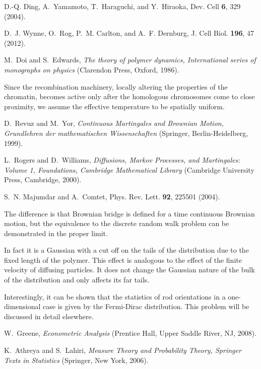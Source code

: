 \documentclass[aps,showpacs,twocolumn,floatfix,prx,superscriptaddress]{revtex4-1}
\begin{document}
\begin{thebibliography}{10}
D.-Q. Ding,
  A.~Yamamoto,
  T.~Haraguchi,
  and Y.~Hiraoka,
  Dev. Cell \textbf{6},
  329 (2004).

D.~J. Wynne,
  O.~Rog,
  P.~M. Carlton,
  and A.~F.
  Dernburg, J. Cell Biol.
  \textbf{196}, 47 (2012).

M.~Doi and
  S.~Edwards,
  \emph{The theory of polymer dynamics, International series
  of monographs on physics} (Clarendon Press, Oxford,
  1986).
  
{\color{blue} Since the recombination machinery, locally altering the properties of the chromatin, becomes active only after the homologous chromosomes come to close proximity, we assume the effective temperature to be spatially uniform.}

D.~Revuz and
  M.~Yor,
  \emph{Continuous Martingales and Brownian Motion,
  Grundlehren der mathematischen Wissenschaften} (Springer, Berlin-Heidelberg, 1999).

L.~Rogers and
  D.~Williams,
  \emph{Diffusions, Markov Processes, and Martingales: Volume
  1, Foundations, Cambridge Mathematical Library}
  (Cambridge University Press, Cambridge, 2000).

S.~N. Majumdar and
  A.~Comtet,
  Phys. Rev. Lett. \textbf{92},
  225501 (2004).
  

The difference is that Brownian bridge is defined for a time continuous Brownian motion, but the equivalence to the discrete random walk problem can be demonstrated in the proper limit.

In fact it is a Gaussian with a cut off on the tails of the distribution due to the fixed length of the polymer. This effect is analogous to the effect of the finite velocity of diffusing particles. It does not change the Gaussian nature of the bulk of the distribution and only affects its far tails.

Interestingly, it can be shown that the statistics of rod orientations in a one-dimensional case is given by the Fermi-Dirac distribution. This problem will be discussed in detail elsewhere.

W.~Greene,
  \emph{Econometric Analysis}
  (Prentice Hall, Upper Saddle River, NJ, 2008).

K.~Athreya and
  S.~Lahiri,
  \emph{Measure Theory and Probability Theory, Springer Texts
  in Statistics }(Springer, New York, 2006).


\end{thebibliography}
\end{document}
